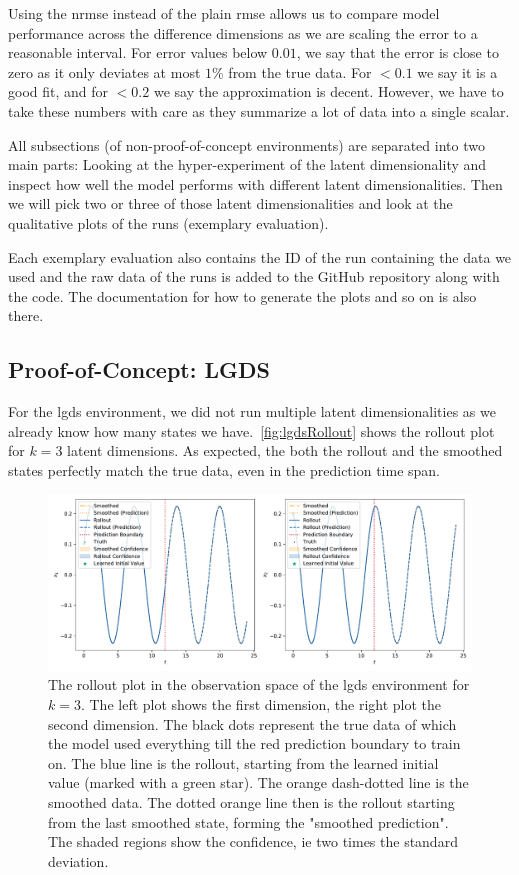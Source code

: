 	Using the \ac{nrmse} instead of the plain \ac{rmse} allows us to compare model performance across the difference dimensions as we are scaling the error to a reasonable interval. For error values below \( 0.01 \), we say that the error is close to zero as it only deviates at most \(1\%\) from the true data. For \(<0.1\) we say it is a good fit, and for \(<0.2\) we say the approximation is decent. However, we have to take these numbers with care as they summarize a lot of data into a single scalar.

	All subsections (of non-proof-of-concept environments) are separated into two main parts: Looking at the hyper-experiment of the latent dimensionality and inspect how well the model performs with different latent dimensionalities. Then we will pick two or three of those latent dimensionalities and look at the qualitative plots of the runs (exemplary evaluation).

	Each exemplary evaluation also contains the ID of the run containing the data we used and the raw data of the runs is added to the GitHub repository along with the code. The documentation for how to generate the plots and so on is also there.

	\subsection{Proof-of-Concept: LGDS}
		For the \ac{lgds} environment, we did not run multiple latent dimensionalities as we already know how many states we have.~\autoref{fig:lgdsRollout} shows the rollout plot for \( k = 3 \) latent dimensions. As expected, the both the rollout and the smoothed states perfectly match the true data, even in the prediction time span.

		\begin{figure}
			\centering
			\includegraphics[width=\linewidth]{figures/results/lgds/rollout-observations-N0.pdf}
			\caption{The rollout plot in the observation space of the \ac{lgds} environment for \(k = 3\). The left plot shows the first dimension, the right plot the second dimension. The black dots represent the true data of which the model used everything till the red prediction boundary to train on. The blue line is the rollout, starting from the learned initial value (marked with a green star). The orange dash-dotted line is the smoothed data. The dotted orange line then is the rollout starting from the last smoothed state, forming the "smoothed prediction". The shaded regions show the confidence, \ac{ie} two times the standard deviation.}
			\label{fig:lgdsRollout}
		\end{figure}

